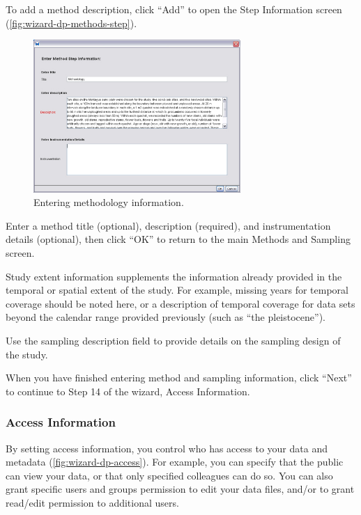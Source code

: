 To add a method description, click ``Add'' to open the Step Information
screen (\autoref{fig:wizard-dp-methods-step}).

\begin{figure}
  \centering
    \includegraphics[width=0.7\textwidth]{images/wizard-dp-methods-step.jpg}
  \caption{Entering methodology information.}
  \label{fig:wizard-dp-methods-step}
\end{figure}

Enter a method title (optional), description (required), and
instrumentation details (optional), then click ``OK'' to return to the
main Methods and Sampling screen. 

Study extent information supplements the information already provided in
the temporal or spatial extent of the study. For example, missing years
for temporal coverage should be noted here, or a description of temporal
coverage for data sets beyond the calendar range provided previously
(such as ``the pleistocene'').

Use the sampling description field to provide details on the sampling
design of the study. 

When you have finished entering method and sampling information, click
``Next'' to continue to Step 14 of the wizard, Access Information.

\subsubsection{Access Information} \label{sec:wizard-dp-access}

By setting access information, you control who has access to your data
and metadata (\autoref{fig:wizard-dp-access}). For example, you can
specify that the public can view your data, or that only specified
colleagues can do so. You can also grant specific users and groups
permission to edit your data files, and/or to grant read/edit permission
to additional users. 


